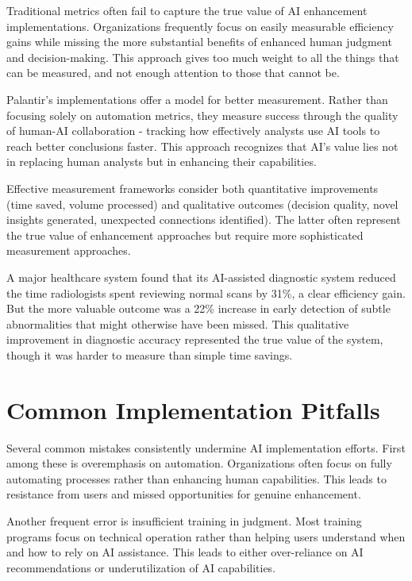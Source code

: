 \documentclass[
  Letterpaper,
]{scrbook}
\begin{document}
Traditional metrics often fail to capture the true value of AI
enhancement implementations. Organizations frequently focus on easily
measurable efficiency gains while missing the more substantial benefits
of enhanced human judgment and
decision-making. This approach gives
too much weight to all the things that can be measured, and not enough
attention to those that cannot be.

Palantir's implementations offer a model
for better measurement. Rather than focusing solely on automation
metrics, they measure success through the quality of human-AI
collaboration -
tracking how effectively analysts use AI tools to reach better
conclusions faster. This approach recognizes that AI's value lies not in
replacing human analysts but in enhancing their capabilities.

Effective measurement frameworks consider both quantitative improvements
(time saved, volume processed) and qualitative outcomes (decision
quality, novel insights generated, unexpected connections identified).
The latter often represent the true value of enhancement approaches but
require more sophisticated measurement approaches.

A major healthcare system found that its AI-assisted diagnostic system
reduced the time radiologists spent reviewing normal scans by 31\%, a
clear efficiency gain. But the more valuable outcome was a 22\% increase
in early detection of subtle abnormalities that might otherwise have
been missed. This qualitative improvement in diagnostic accuracy
represented the true value of the system, though it was harder to
measure than simple time savings.

\section{Common Implementation
Pitfalls}\label{common-implementation-pitfalls}

Several common mistakes consistently undermine AI implementation
efforts. First among these is overemphasis on automation. Organizations
often focus on fully automating processes rather than enhancing human
capabilities. This leads to resistance from users and missed
opportunities for genuine enhancement.

Another frequent error is insufficient training in judgment. Most
training programs focus on technical operation rather than helping users
understand when and how to rely on AI assistance. This leads to either
over-reliance on AI recommendations or underutilization of AI
capabilities.
\end{document}
